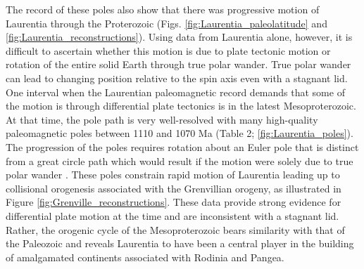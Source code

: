 \documentclass[11pt,letterpaper]{article}
\begin{document}
The record of these poles also show that there was progressive motion of Laurentia through the Proterozoic (Figs. \ref{fig:Laurentia_paleolatitude} and \ref{fig:Laurentia_reconstructions}). Using data from Laurentia alone, however, it is difficult to ascertain whether this motion is due to plate tectonic motion or rotation of the entire solid Earth through true polar wander. True polar wander can lead to changing position relative to the spin axis even with a stagnant lid. One interval when the Laurentian paleomagnetic record demands that some of the motion is through differential plate tectonics is in the latest Mesoproterozoic. At that time, the pole path is very well-resolved with many high-quality paleomagnetic poles between 1110 and 1070 Ma (Table 2; \ref{fig:Laurentia_poles}). The progression of the poles requires rotation about an Euler pole that is distinct from a great circle path which would result if the motion were solely due to true polar wander \citep{Swanson-Hysell2019a}. These poles constrain rapid motion of Laurentia leading up to collisional orogenesis associated with the Grenvillian orogeny, as illustrated in Figure \ref{fig:Grenville_reconstructions}. These data provide strong evidence for differential plate motion at the time and are inconsistent with a stagnant lid. Rather, the orogenic cycle of the Mesoproterozoic bears similarity with that of the Paleozoic and reveals Laurentia to have been a central player in the building of amalgamated continents associated with Rodinia and Pangea.

%
%
%
%
\end{document}
